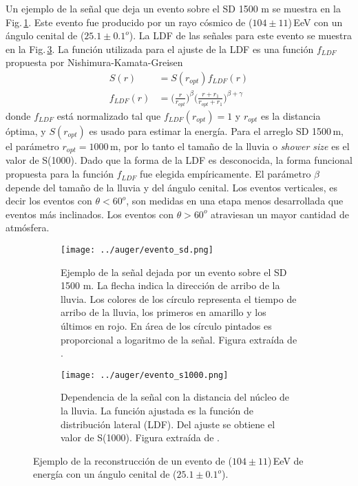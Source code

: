 Un ejemplo de la señal que deja un evento sobre el SD 1500 m se muestra en la Fig.\,\ref{fig:evento_sd}. Este evento fue producido por un rayo cósmico de ($104\pm11$)\,EeV con un ángulo cenital de ($25.1\pm0.1 ^o$). La LDF de las señales para este evento se muestra en la Fig.\,\ref{fig:evento_S1000}. La función utilizada para el ajuste de la LDF es una función  $f_{LDF}$ propuesta por Nishimura-Kamata-Greisen \cite{data}
\begin{align*}
	S(r) &= S(r_{opt})f_{LDF}(r)\\
	f_{LDF}(r)&=\bigg(\frac{r}{r_{opt}}\bigg)^{\beta}\bigg(\frac{r+r_1}{r_{opt}+r_1}\bigg)^{\beta + \gamma}
\end{align*}
donde $f_{LDF}$ está normalizado tal que $f_{LDF}(r_{opt})=1$ y $r_{opt}$ es la distancia óptima, %
y $S(r_{opt})$ es usado para estimar la energía. Para el arreglo SD 1500\,m, el parámetro $r_{opt}=1000\,$m, por lo tanto el tamaño de la lluvia o \emph{shower size} es el valor de S(1000). Dado que la forma de la LDF es desconocida, la forma funcional propuesta para la función $f_{LDF}$ fue elegida empíricamente.  El parámetro $\beta$ depende del tamaño de la lluvia y del ángulo cenital. Los eventos verticales, es decir los eventos con $\theta < 60^o$, son medidas en una etapa menos desarrollada que eventos más inclinados. Los eventos con $\theta>60^o$ atraviesan un mayor cantidad de atmósfera.

\begin{figure}[H]
    \begin{subfigure}[t]{0.51\textwidth}
	\texttt{[image: ../auger/evento\_sd.png]}
	\caption{Ejemplo de la señal dejada por un evento sobre el SD 1500 m. La flecha indica la dirección de arribo de la lluvia. Los colores de los círculo representa el tiempo de arribo de la lluvia, los primeros en amarillo y los últimos en rojo. En área de los círculo pintados es proporcional a logaritmo de la señal. Figura extraída de \cite{como_funciona_auger}. } 	\label{fig:evento_sd}
    \end{subfigure}%
    \hspace{\fill}
    \begin{subfigure}[t]{0.45\textwidth}
	\texttt{[image: ../auger/evento\_s1000.png]}
	\caption{Dependencia de la señal con la distancia del núcleo de la lluvia. La función ajustada es la función de distribución lateral (LDF). Del ajuste se obtiene el valor de S(1000). Figura extraída de \cite{como_funciona_auger}. } 	\label{fig:evento_S1000}
    \end{subfigure}%
    \caption{Ejemplo de la reconstrucción de un evento de ($104\pm11$)\,EeV de energía con un ángulo cenital de ($25.1\pm0.1 ^o$).}
	\end{figure}



